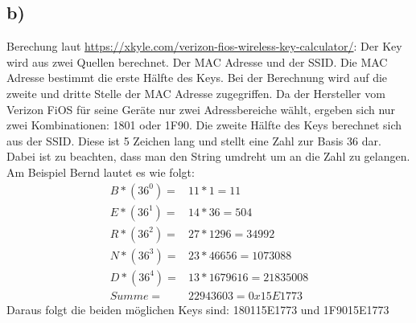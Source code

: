 \documentclass[10pt,a4paper]{article}
\begin{document}
\subsection*{b)}
Berechung laut \href{https://xkyle.com/verizon-fios-wireless-key-calculator/}{https://xkyle.com/verizon-fios-wireless-key-calculator/}:
Der Key wird aus zwei Quellen berechnet. Der MAC Adresse und der SSID. Die MAC Adresse bestimmt die erste Hälfte des Keys. Bei der Berechnung wird auf die zweite und dritte Stelle der MAC Adresse zugegriffen. Da der Hersteller vom Verizon FiOS für seine Geräte nur zwei Adressbereiche wählt, ergeben sich nur zwei Kombinationen: 1801 oder 1F90. 
Die zweite Hälfte des Keys berechnet sich aus der SSID. Diese ist 5 Zeichen lang und stellt eine Zahl zur Basis 36 dar. Dabei ist zu beachten, dass man den String umdreht um an die Zahl zu gelangen.
Am Beispiel Bernd lautet es wie folgt:\\
\begin{align*}
B*(36^0) = &11 * 1 = 11\\
E*(36^1) = &14 * 36 = 504\\
R*(36^2) = &27 * 1296 = 34992\\
N*(36^3) = &23 * 46656 = 1073088\\
D*(36^4) = &13 * 1679616 = 21835008\\
Summe = &22943603 = 0x15E1773
\end{align*}
Daraus folgt die beiden möglichen Keys sind: 180115E1773 und 1F9015E1773
\end{document}
